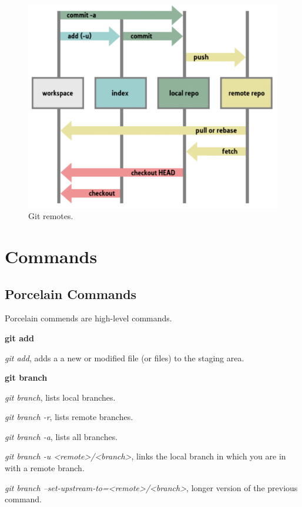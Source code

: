 \begin{refsection}
\begin{figure}[h!]
  \centering
  \includegraphics[width=12cm]{./chapter/git/figures/git_spaces.png}
  \caption{Git remotes.}\label{git_remotes}
\end{figure}

\section{Commands}


\subsection{Porcelain Commands}

Porcelain commends are high-level commands.

\vspace*{5mm} \noindent \textbf{git add}

\noindent \emph{git add}, adds a a new or modified file (or files) to the staging area.

\vspace*{5mm} \noindent \textbf{git branch}

\noindent \emph{git branch}, lists local branches.

\noindent \emph{git branch -r}, lists remote branches.

\noindent \emph{git branch -a}, lists all branches.

\noindent \emph{git branch -u <remote>/<branch>}, links the local branch in which you are in with a remote branch.

\noindent \emph{git branch --set-upstream-to=<remote>/<branch>}, longer version of the previous command.


\end{refsection}
